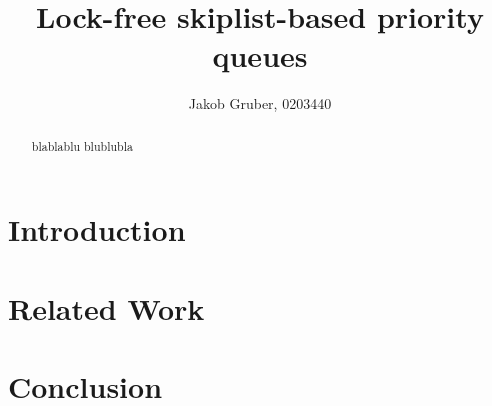 \documentclass[a4paper,10pt]{article}
\title{Lock-free skiplist-based priority queues}
\author{Jakob Gruber, 0203440}
\begin{document}
\maketitle

\begin{abstract}
blablablu blublubla
\end{abstract}

\section{Introduction}
\section{Related Work}
\section{Conclusion}

\nocite{*}

\printbibliography
\end{document}
